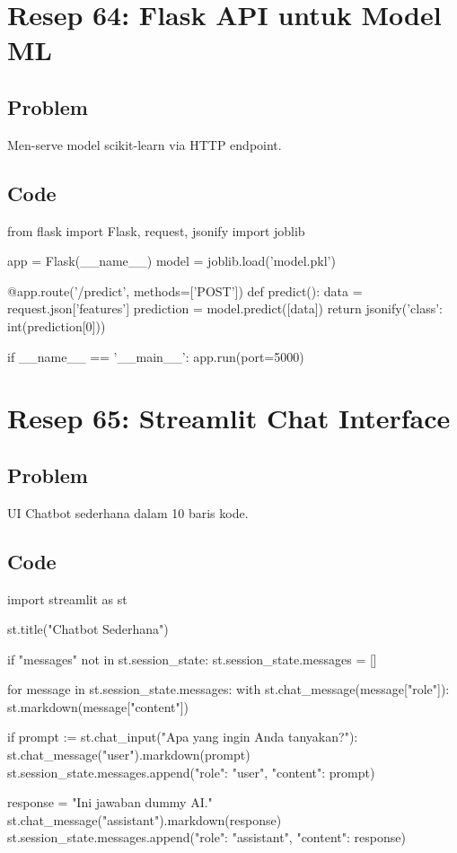 \newpage

\section{Resep 64: Flask API untuk Model ML}

\subsection*{Problem}
Men-serve model scikit-learn via HTTP endpoint.

\subsection*{Code}
\begin{codeblock}[language=Python]
from flask import Flask, request, jsonify
import joblib

app = Flask(__name__)
model = joblib.load('model.pkl')

@app.route('/predict', methods=['POST'])
def predict():
    data = request.json['features']
    prediction = model.predict([data])
    return jsonify({'class': int(prediction[0])})

if __name__ == '__main__':
    app.run(port=5000)
\end{codeblock}

\newpage

\section{Resep 65: Streamlit Chat Interface}

\subsection*{Problem}
UI Chatbot sederhana dalam 10 baris kode.

\subsection*{Code}
\begin{codeblock}[language=Python]
import streamlit as st

st.title("Chatbot Sederhana")

if "messages" not in st.session_state:
    st.session_state.messages = []

for message in st.session_state.messages:
    with st.chat_message(message["role"]):
        st.markdown(message["content"])

if prompt := st.chat_input("Apa yang ingin Anda tanyakan?"):
    st.chat_message("user").markdown(prompt)
    st.session_state.messages.append({"role": "user", "content": prompt})

    response = "Ini jawaban dummy AI."
    st.chat_message("assistant").markdown(response)
    st.session_state.messages.append({"role": "assistant", "content": response})
\end{codeblock}
